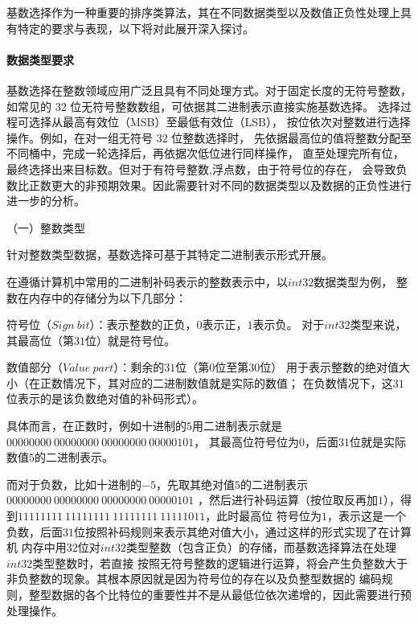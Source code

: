 基数选择作为一种重要的排序类算法，其在不同数据类型以及数值正负性处理上具有特定的要求与表现，以下将对此展开深入探讨。

\paragraph{数据类型要求}

基数选择在整数领域应用广泛且具有不同处理方式。对于固定长度的无符号整数，
如常见的 32 位无符号整数数组，可依据其二进制表示直接实施基数选择。
选择过程可选择从最高有效位（MSB）至最低有效位（LSB），
按位依次对整数进行选择操作。例如，在对一组无符号 32 位整数选择时，
先依据最高位的值将整数分配至不同桶中，完成一轮选择后，再依据次低位进行同样操作，
直至处理完所有位，最终选择出来目标数。但对于有符号整数,浮点数，由于符号位的存在，
会导致负数比正数更大的非预期效果。因此需要针对不同的数据类型以及数据的正负性进行
进一步的分析。

（一）整数类型

针对整数类型数据，基数选择可基于其特定二进制表示形式开展。

在遵循计算机中常用的二进制补码表示的整数表示中，以\(int32\)数据类型为例，
整数在内存中的存储分为以下几部分：

符号位（\(Sign\ bit\)）：表示整数的正负，\(0\)表示正，\(1\)表示负。
对于\(int32\)类型来说，其最高位（第\(31\)位）就是符号位。

数值部分（\(Value\ part\)）：剩余的\(31\)位（第\(0\)位至第\(30\)位）
用于表示整数的绝对值大小（在正数情况下，其对应的二进制数值就是实际的数值；
在负数情况下，这\(31\)位表示的是该负数绝对值的补码形式）。

具体而言，在正数时，例如十进制的\(5\)用二进制表示就是\(00000000\ 00000000\ 00000000\ 00000101\)，
其最高位符号位为\(0\)，后面\(31\)位就是实际数值\(5\)的二进制表示。

而对于负数，比如十进制的\(-5\)，先取其绝对值\(5\)的二进制表示\(00000000\ 00000000\ 00000000\ 00000101\)
，然后进行补码运算（按位取反再加\(1\)），得到\(11111111\ 11111111\ 11111111\ 11111011\)，此时最高位
符号位为\(1\)，表示这是一个负数，后面\(31\)位按照补码规则来表示其绝对值大小，通过这样的形式实现了在计算机
内存中用\(32\)位对\(int32\)类型整数（包含正负）的存储，而基数选择算法在处理\(int32\)类型整数时，若直接
按照无符号整数的逻辑进行运算，将会产生负整数大于非负整数的现象。其根本原因就是因为符号位的存在以及负整型数据的
编码规则，整型数据的各个比特位的重要性并不是从最低位依次递增的，因此需要进行预处理操作。

